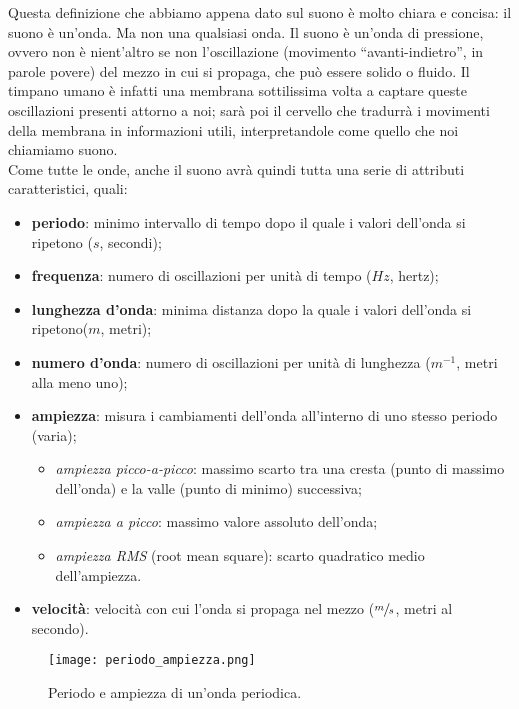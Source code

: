 		Questa definizione che abbiamo appena dato sul suono è molto chiara e concisa: il suono è un'onda. Ma non una qualsiasi onda. Il suono è un'onda di pressione, ovvero non è nient'altro se non l'oscillazione (movimento ``avanti-indietro'', in parole povere) del mezzo in cui si propaga, che può essere solido o fluido. Il timpano umano è infatti una membrana sottilissima volta a captare queste oscillazioni presenti attorno a noi; sarà poi il cervello che tradurrà i movimenti della membrana in informazioni utili, interpretandole come quello che noi chiamiamo suono.\\
		Come tutte le onde, anche il suono avrà quindi tutta una serie di attributi caratteristici, quali:
		\begin{itemize}
			\item \textbf{periodo}: minimo intervallo di tempo dopo il quale i valori dell'onda si ripetono ($s$, secondi);
			\item \textbf{frequenza}: numero di oscillazioni per unità di tempo ($Hz$, hertz);
			\item \textbf{lunghezza d'onda}: minima distanza dopo la quale  i valori dell'onda si ripetono($m$, metri);
			\item \textbf{numero d'onda}: numero di oscillazioni per unità di lunghezza ($m^{-1}$, metri alla meno uno);
			\item \textbf{ampiezza}: misura i cambiamenti dell'onda all'interno di uno stesso periodo (varia);
				\begin{itemize}
					\item \textit{ampiezza picco-a-picco}: massimo scarto tra una cresta (punto di massimo dell'onda) e la valle (punto di minimo) successiva;
					\item \textit{ampiezza a picco}: massimo valore assoluto dell'onda;
					\item \textit{ampiezza RMS} (root mean square): scarto quadratico medio dell'ampiezza.
				\end{itemize}
			\item \textbf{velocità}: velocità con cui l'onda si propaga nel mezzo ($\sfrac{m}{s}$, metri al secondo).
		\end{itemize}
		
		\begin{figure}[h!]
			\centering
				\texttt{[image: periodo\_ampiezza.png]}
			\caption{Periodo e ampiezza di un'onda periodica.}
			\label{fig:periodo_ampiezza}
		\end{figure}
		
